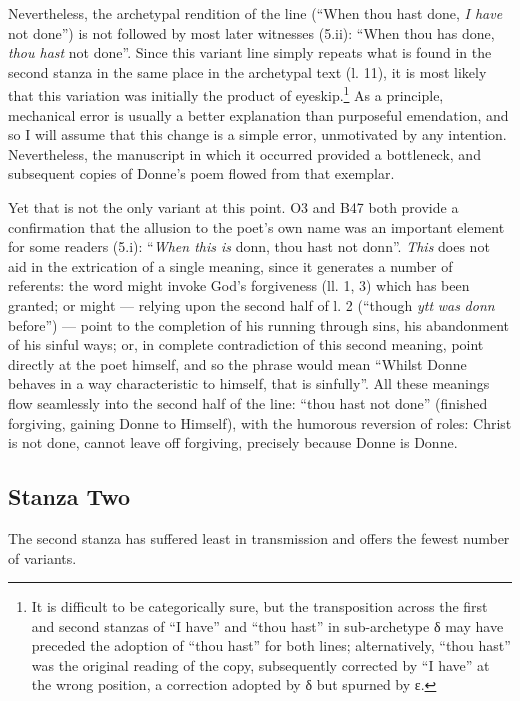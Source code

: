 \begin{paper}
Nevertheless, the archetypal rendition of the line (``When thou hast
done, \emph{I have} not done'') is not followed by most later witnesses
(5.ii): ``When thou has done, \emph{thou hast} not done''. Since this
variant line simply repeats what is found in the second stanza in the
same place in the archetypal text (l. 11), it is most likely that this
variation was initially the product of eyeskip.\footnote{It is difficult
  to be categorically sure, but the transposition across the first and
  second stanzas of ``I have'' and ``thou hast'' in sub-archetype δ may
  have preceded the adoption of ``thou hast'' for both lines;
  alternatively, ``thou hast'' was the original reading of the copy,
  subsequently corrected by ``I have'' at the wrong position, a
  correction adopted by δ but spurned by ε.} As a principle, mechanical
error is usually a better explanation than purposeful emendation, and so
I will assume that this change is a simple error, unmotivated by any
intention. Nevertheless, the manuscript in which it occurred provided a
bottleneck, and subsequent copies of Donne's poem flowed from that
exemplar.

Yet that is not the only variant at this point. O3 and B47 both provide
a confirmation that the allusion to the poet's own name was an important
element for some readers (5.i): ``\emph{When this is} donn, thou hast
not donn''. \emph{This} does not aid in the extrication of a single
meaning, since it generates a number of referents: the word might invoke
God's forgiveness (ll. 1, 3) which has been granted; or might ---
relying upon the second half of l. 2 (``though \emph{ytt} \emph{was}
\emph{donn} before'') --- point to the completion of his running through
sins, his abandonment of his sinful ways; or, in complete contradiction
of this second meaning, point directly at the poet himself, and so the
phrase would mean ``Whilst Donne behaves in a way characteristic to
himself, that is sinfully''. All these meanings flow seamlessly into the
second half of the line: ``thou hast not done'' (finished forgiving,
gaining Donne to Himself), with the humorous reversion of roles: Christ
is not done, cannot leave off forgiving, precisely because Donne is
Donne.

\subsection{Stanza Two}

The second stanza has suffered least in transmission and offers the
fewest number of variants.


\end{paper}
